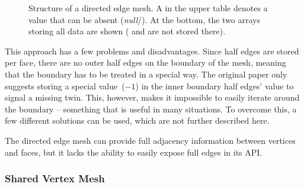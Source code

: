 \begin{figure}[t]
  \vspace{2mm}

  \caption{
    Structure of a directed edge mesh.
    A  in the upper table denotes a value that can be absent (\emph{null}/).
    At the bottom, the two arrays storing all data are shown ( and  are not stored there).
  }
  \label{fig:dem-structure}
\end{figure}

This approach has a few problems and disadvantages.
Since half edges are stored per face, there are no outer half edges on the boundary of the mesh, meaning that the boundary has to be treated in a special way.
The original paper only suggests storing a special value~($-1$) in the inner boundary half edges'  value to signal a missing twin.
This, however, makes it impossible to easily iterate around the boundary -- something that is useful in many situations.
To overcome this, a few different solutions can be used, which are not further described here.

The directed edge mesh can provide full adjacency information between vertices and faces, but it lacks the ability to easily expose full edges in its API.

\newpage
\subsubsection*{Shared Vertex Mesh}

